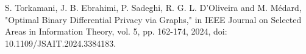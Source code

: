 \begin{thebibliography}{00}\begin{latin}

	 S. Torkamani, J. B. Ebrahimi, P. Sadeghi, R. G. L. D’Oliveira and M. Médard, "Optimal Binary Differential Privacy via Graphs," in IEEE Journal on Selected Areas in Information Theory, vol. 5, pp. 162-174, 2024, doi: 10.1109/JSAIT.2024.3384183.

\end{latin}\end{thebibliography}
